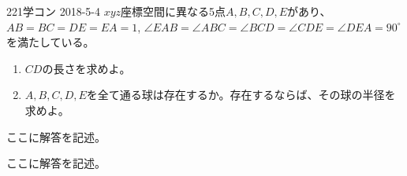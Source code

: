 \begin{thm}{221}{}{学コン 2018-5-4}
 $xyz$座標空間に異なる5点$A, B, C, D, E$があり、$AB=BC=DE=EA=1$, $\angle{EAB}=\angle{ABC}=\angle{BCD}=\angle{CDE}=\angle{DEA}=90^\circ$ を満たしている。
 \begin{enumerate}
  \item $CD$の長さを求めよ。
  \item $A, B, C, D, E$を全て通る球は存在するか。存在するならば、その球の半径を求めよ。
 \end{enumerate}
\end{thm}

ここに解答を記述。

ここに解答を記述。